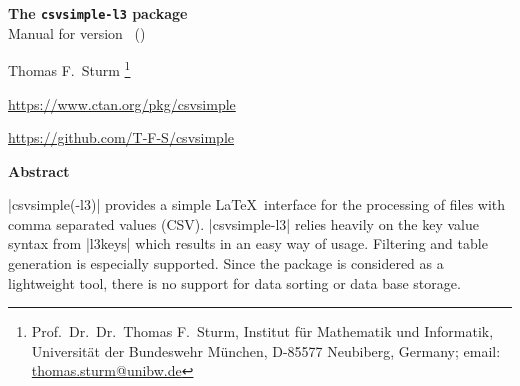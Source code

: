 \documentclass[a4paper,11pt]{ltxdoc}
\begin{document}
\begin{center}
\begin{tcolorbox}[enhanced,hbox,tikznode,left=8mm,right=8mm,boxrule=0.4pt,
  colback=white,colframe=black!50!yellow,
  drop lifted shadow=black!50!yellow,arc is angular,
  before=\par\vspace*{5mm},after=\par\bigskip]
{\bfseries\LARGE The \texttt{csvsimple-l3} package}\\[3mm]
{\large Manual for version \version\ (\datum)}
\end{tcolorbox}
{\large Thomas F.~Sturm%
  \footnote{Prof.~Dr.~Dr.~Thomas F.~Sturm, Institut f\"{u}r Mathematik und Informatik,
    Universit\"{a}t der Bundeswehr M\"{u}nchen, D-85577 Neubiberg, Germany;
     email: \href{mailto:thomas.sturm@unibw.de}{thomas.sturm@unibw.de}}\par\medskip
\normalsize\url{https://www.ctan.org/pkg/csvsimple}\par
\url{https://github.com/T-F-S/csvsimple}
}
\end{center}
\bigskip
\begin{absquote}
  \begin{center}\bfseries Abstract\end{center}
  |csvsimple(-l3)| provides a simple \LaTeX\ interface for the processing of files with
  comma separated values (CSV). |csvsimple-l3| relies heavily on the key value
  syntax from |l3keys| which results in an easy way of usage.
  Filtering and table generation is especially supported. Since the package
  is considered as a lightweight tool, there is no support for data sorting
  or data base storage.
\end{absquote}

\vspace{1cm}
\end{document}
